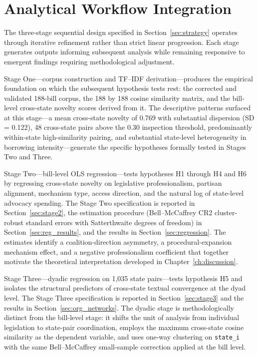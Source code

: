 \documentclass[12pt]{report}
\begin{document}
\section{Analytical Workflow Integration}
\label{app:B.2}

The three-stage sequential design specified in Section~\ref{sec:strategy} operates through iterative refinement rather than strict linear progression. Each stage generates outputs informing subsequent analysis while remaining responsive to emergent findings requiring methodological adjustment.

Stage One---corpus construction and TF--IDF derivation---produces the empirical
foundation on which the subsequent hypothesis tests rest: the corrected and validated
188-bill corpus, the 188 by 188 cosine similarity matrix, and the bill-level cross-state
novelty scores derived from it. The descriptive patterns surfaced at this stage---a
mean cross-state novelty of 0.769 with substantial dispersion (SD = 0.122), 48 cross-state
pairs above the 0.30 inspection threshold, predominantly within-state high-similarity
pairing, and substantial state-level heterogeneity in borrowing intensity---generate
the specific hypotheses formally tested in Stages Two and Three.

Stage Two---bill-level OLS regression---tests hypotheses H1 through H4 and H6 by
regressing cross-state novelty on legislative professionalism, partisan alignment,
mechanism type, access direction, and the natural log of state-level advocacy spending.
The Stage Two specification is reported in Section~\ref{sec:stage2}, the estimation
procedure (Bell--McCaffrey CR2 cluster-robust standard errors with Satterthwaite
degrees of freedom) in Section~\ref{sec:reg_results}, and the results in Section~\ref{sec:regression}.
The estimates identify a coalition-direction asymmetry, a procedural-expansion mechanism
effect, and a negative professionalism coefficient that together motivate the theoretical
interpretation developed in Chapter~\ref{ch:discussion}.

Stage Three---dyadic regression on 1,035 state pairs---tests hypothesis H5 and isolates the structural predictors of cross-state textual convergence at the dyad level. The Stage Three specification is reported in Section~\ref{sec:stage3} and the results in
Section~\ref{sec:org_networks}. The dyadic stage is methodologically distinct from the bill-level stage: it shifts the unit of analysis from individual legislation to state-pair coordination, employs the maximum cross-state cosine similarity as the dependent variable, and uses one-way clustering on \texttt{state\_i} with the same Bell--McCaffrey small-sample
correction applied at the bill level.
\end{document}

